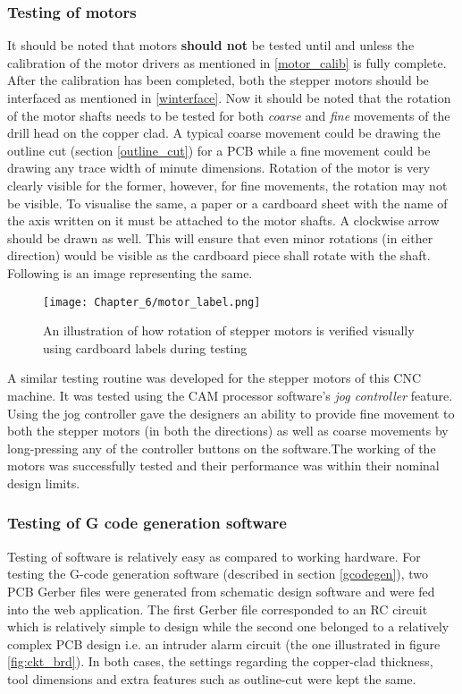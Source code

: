 \subsubsection*{Testing of motors}

It should be noted that motors \textbf{should not} be tested until and unless the calibration of the motor drivers as mentioned in \ref{motor_calib} is fully complete. After the calibration has been completed, both the stepper motors should be interfaced as mentioned in \ref{winterface}. Now it should be noted that the rotation of the motor shafts needs to be tested for both \textit{coarse} and \textit{fine} movements of the drill head on the copper clad. A typical coarse movement could be drawing the outline cut (section \ref{outline_cut}) for a PCB while a fine movement could be drawing any trace width of minute dimensions. Rotation of the motor is very clearly visible for the former, however, for fine movements, the rotation may not be visible. To visualise the same, a paper or a cardboard sheet with the name of the axis written on it must be attached to the motor shafts. A clockwise arrow should be drawn as well. This will ensure that even minor rotations (in either direction) would be visible as the cardboard piece shall rotate with the shaft. Following is an image representing the same. \par

\begin{figure}[h]
 \centering
 \texttt{[image: Chapter\_6/motor\_label.png]}
 \caption{An illustration of how rotation of stepper motors is verified visually using cardboard labels during testing}
 \label{fig:motorlabel}
\end{figure}

A similar testing routine was developed for the stepper motors of this CNC machine. It was tested using the CAM processor software’s \textit{jog controller} feature. Using the jog controller gave the designers an ability to provide fine movement to both the stepper motors (in both the directions) as well as coarse movements by long-pressing any of the controller buttons on the software.The working of the motors was successfully tested and their performance was within their nominal design limits.

\subsubsection*{Testing of G code generation software}

Testing of software is relatively easy as compared to working hardware. For testing the G-code generation software (described in section \ref{gcodegen}), two PCB Gerber files were generated from schematic design software and were fed into the web application. The first Gerber file corresponded to an RC circuit which is relatively simple to design while the second one belonged to a relatively complex PCB design i.e. an intruder alarm circuit (the one illustrated in figure \ref{fig:ckt_brd}). In both cases, the settings regarding the copper-clad thickness, tool dimensions and extra features such as outline-cut were kept the same. \par

